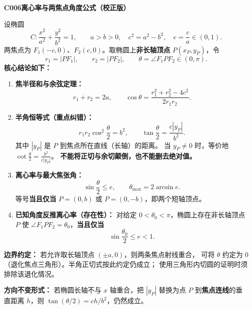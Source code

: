 \begin{statementbox}
\textbf{C006\quad 离心率与两焦点角度公式（校正版）}

设椭圆
\[
C:\frac{x^2}{a^2}+\frac{y^2}{b^2}=1,
\qquad a>b>0,\quad c^2=a^2-b^2,\quad e=\frac ca\in(0,1).
\]
两焦点为 $F_1(-c,0)$、$F_2(c,0)$。取椭圆上\textbf{非长轴顶点} $P(x_P,y_P)$，令
\[
r_1=|PF_1|,\qquad r_2=|PF_2|,\qquad
\theta=\angle F_1PF_2\in(0,\pi).
\]
\textbf{核心结论如下：}
\begin{enumerate}
  \item \textbf{焦半径和与余弦定理：}
  \[
  r_1+r_2=2a,\qquad
  \boxed{\cos\theta=\frac{r_1^2+r_2^2-4c^2}{2r_1r_2}}.
  \]
  \item \textbf{半角恒等式（重点纠错）：}
  \[
  \boxed{r_1r_2\cos^2\frac\theta2=b^2},\qquad
  \boxed{\tan\frac\theta2=\frac{c|y_P|}{b^2}}.
  \]
  其中 $|y_P|$ 是 $P$ 到焦点所在直线（长轴）的距离。
  当 $y_P\ne0$ 时，等价地
  $\displaystyle\cot\frac\theta2=\frac{b^2}{c|y_P|}$。
  \textbf{不能将正切与余切颠倒，也不能删去绝对值。}
  \item \textbf{离心率与最大焦张角：}
  \[
  \boxed{\sin\frac\theta2\le e},\qquad
  \boxed{\theta_{\max}=2\arcsin e}.
  \]
  等号\textbf{当且仅当} $P=(0,b)$ 或 $P=(0,-b)$，即两个短轴顶点。
  \item \textbf{已知角度反推离心率（存在性）：} 对给定
  $0<\theta_0<\pi$，椭圆上存在非长轴顶点 $P$ 使
  $\angle F_1PF_2=\theta_0$，\textbf{当且仅当}
  \[
  \boxed{\sin\frac{\theta_0}{2}\le e<1}.
  \]
\end{enumerate}
\textbf{边界约定：} 若允许取长轴顶点 $(\pm a,0)$，则两条焦点射线重合，
可将 $\theta$ 约定为 $0$（退化焦点三角形）。半角正切式按此约定仍成立；
使用三角形内切圆的证明时须排除该退化情况。

\textbf{方向不变形式：} 若椭圆长轴不与 $x$ 轴重合，把 $|y_P|$
替换为点 $P$ 到\textbf{焦点连线}的垂直距离 $h$，则
$\displaystyle\tan(\theta/2)=ch/b^2$，仍然成立。
\end{statementbox}
